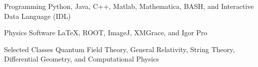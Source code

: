 

\begin{cvskills}

  \cvskill
    {Programming} %
    { Python, Java, C++, Matlab, Mathematica, BASH, and Interactive Data Language (IDL)} %

  \cvskill
    {Physics Software} %
    {LaTeX, ROOT, ImageJ, XMGrace, and Igor Pro} %

  \cvskill
    {Selected Classes} %
    {Quantum Field Theory, General Relativity, String Theory, Differential Geometry, and Computational Physics} %

\end{cvskills}
